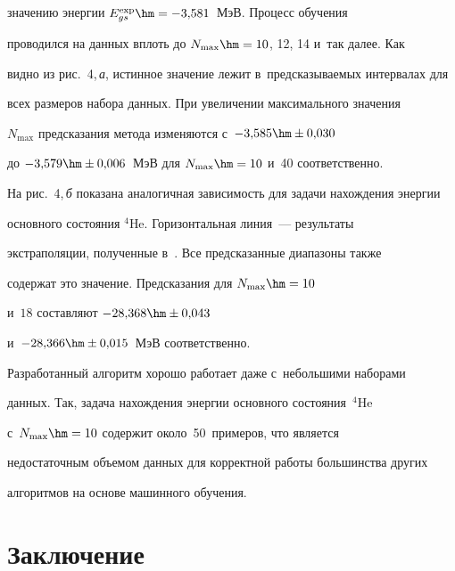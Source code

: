 значению энергии $E_{gs}^{\mathrm{exp}}\hm= -3{,}581$~МэВ. Процесс обучения 


проводился на данных вплоть до $N_{\max}\hm= 10$, 12, 14 и~так далее. Как 


видно из рис.~4,\,\textit{а}, истинное значение лежит в~пред\-ска\-зы\-ва\-емых интервалах для 


всех размеров набора данных. При увеличении максимального значения 


$N_{\max}$ пред\-ска\-за\-ния метода изменяются с~$-3{,}585\hm\pm 0{,}030$ 


до $-3{,}579\hm\pm 0{,}006$~МэВ для $N_{\max}\hm=10$ и~40 соответственно.


  


  








  На рис.~4,\,\textit{б} показана аналогичная за\-ви\-си\-мость для задачи на\-хож\-де\-ния энергии 


основного со\-сто\-яния ${}^4$He. Горизонтальная линия~--- результаты 


экстраполяции, полученные в~\cite{5-b}. Все предсказанные диапазоны так\-же 


содержат это значение. Пред\-ска\-за\-ния для $N_{\max}\hm=10$ 


и~$18$ со\-став\-ля\-ют $-28{,}368\hm\pm 0{,}043$  


и~$-28{,}366 \hm\pm 0{,}015$~МэВ соответственно.


  


   


  


  Разработанный алгоритм хорошо работает даже с~небольшими наборами 


данных. Так, задача на\-хож\-де\-ния энергии основного со\-сто\-яния~${}^4$He 


с~$N_{\max}\hm=10$ содержит около~50~примеров, что является 


недостаточным объемом данных для корректной работы большинства других 


алгоритмов на основе машинного обуче\-ния.


  


\section{Заключение}





